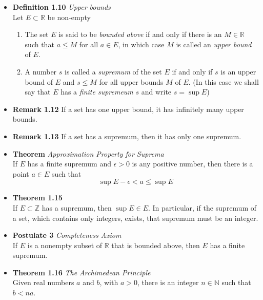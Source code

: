 \documentclass[11pt,a4paper]{article}
\begin{document}
\begin{itemize}
    \item \textbf{Definition 1.10} \emph{Upper bounds} \\
        Let $E \subset \mathbb{R}$ be non-empty
        \begin{enumerate}
            \item The set $E$ is said to be \emph{bounded above} if and only if there is an
                $M \in \mathbb{R}$ such that $a \leq M$ for all $a \in E$,
                in which case $M$ is called an \emph{upper bound} of $E$.
            \item A number $s$ is called a \emph{supremum} of the set $E$ if and only if $s$
                is an upper bound of $E$ and $s \leq M$ for all upper bounds $M$ of $E$.
                (In this case we shall say that $E$ has a \emph{finite supremeum} $s$ and write
                $s = \sup E$)
        \end{enumerate}

    \item \textbf{Remark 1.12}
        If a set has one upper bound, it has infinitely many upper bounds.

    \item \textbf{Remark 1.13}
        If a set has a supremum, then it has only one supremum.

    \item \textbf{Theorem} \emph{Approximation Property for Suprema} \\
        If $E$ has a finite supremum and $\epsilon > 0$ is any positive number, then there is a
        point $a \in E$ such that
        \[
            \sup E - \epsilon < a \leq \sup E
        \]

    \item \textbf{Theorem 1.15} \\
        If $E \subset \mathbb{Z}$ has a supremum, then $\sup E \in E$.
        In particular, if the supremum of a set, which contains only integers, exists,
        that supremum must be an integer.

    \item \textbf{Postulate 3} \emph{Completeness Axiom} \\
        If $E$ is a nonempty subset of $\mathbb{R}$ that is bounded above, then $E$ has a finite
        supremum.

    \item \textbf{Theorem 1.16} \emph{The Archimedean Principle} \\
        Given real numbers $a$ and $b$, with $a > 0$, there is an integer $n \in \mathbb{N}$
        such that $b < na$.


\end{itemize}
\end{document}

